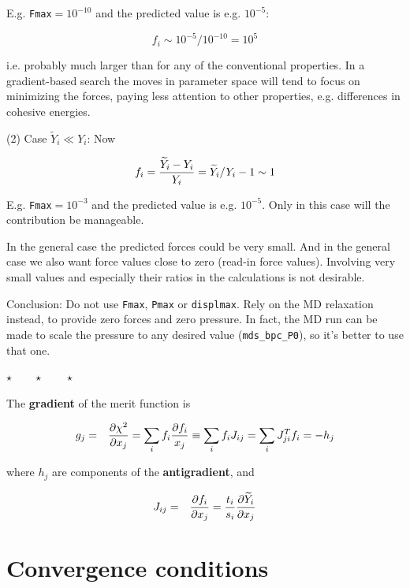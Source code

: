 \documentclass[a4paper,12pt,pdftex,onecolumn]{article}
\newcommand{\stars}{\begin{center}%
\vspace{1em plus 0.5em minus 0.5em}%
$\star \qquad \star \qquad \star$%
\vspace{1em plus 0.5em minus 0.5em}%
\end{center}}
\begin{document}
E.g. \verb+Fmax+$ = 10^{-10}$ and the predicted value is e.g. $10^{-5}$:

\begin{equation}
f_i \sim 10^{-5} / 10^{-10} = 10^5
\end{equation}

i.e. probably much larger than for any of the conventional properties.
In a gradient-based search the moves in parameter space will tend to focus
on minimizing the forces, paying less attention to other properties,
e.g. differences in cohesive energies.

(2) Case $\widetilde{Y}_i \ll Y_i$: Now

\begin{equation}
f_i = {\widetilde{Y}_i - Y_i \over Y_i}
= \widetilde{Y}_i/Y_i - 1 \sim 1
\end{equation}

E.g. \verb+Fmax+$ = 10^{-3}$ and the predicted value is e.g. $10^{-5}$.
Only in this case will the contribution be manageable.

In the general case the predicted forces could be very small. And in
the general case we also want force values close to zero (read-in force
values). Involving very small values and especially their ratios in the
calculations is not desirable.

Conclusion: Do not use \verb+Fmax+, \verb+Pmax+ or \verb+displmax+. Rely on the
MD relaxation instead, to provide zero forces and zero pressure.
In fact, the MD run can be made to scale the pressure to any desired
value (\verb+mds_bpc_P0+), so it's better to use that one.


\stars



The \textbf{gradient} of the merit function is

\begin{eqnarray}
g_j &=& {\partial \chi^2 \over \partial x_j}
= \sum_i f_i {\partial f_i \over x_j}
\equiv \sum_i f_i J_{ij} = \sum_i J^T_{ji} f_i = -h_j
\end{eqnarray}

where $h_j$ are components of the \textbf{antigradient}, and

\begin{eqnarray}
J_{ij} &=& {\partial f_i \over \partial x_j}
= {t_i \over s_i} {\partial \widetilde{Y}_i \over \partial x_j}
\end{eqnarray}





\section{Convergence conditions}
\end{document}
